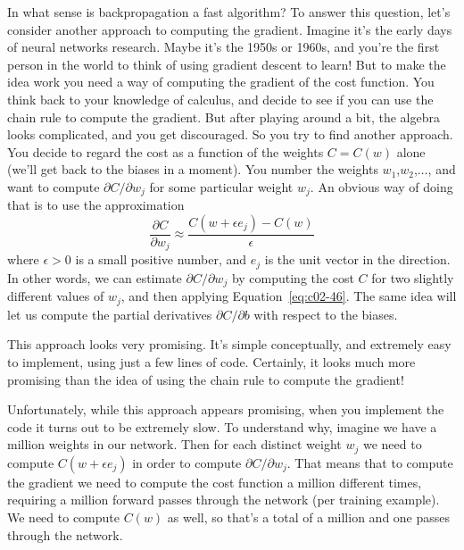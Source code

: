 In what sense is backpropagation a fast algorithm? To answer this question, let's consider another approach to computing the gradient. Imagine it's the early days of neural networks research. Maybe it's the 1950s or 1960s, and you're the first person in the world to think of using gradient descent to learn! But to make the idea work you need a way of computing the gradient of the cost function. You think back to your knowledge of calculus, and decide to see if you can use the chain rule to compute the gradient. But after playing around a bit, the algebra looks complicated, and you get discouraged. So you try to find another approach. You decide to regard the cost as a function of the weights $C=C(w)$ alone (we'll get back to the biases in a moment). You number the weights $w_1$,$w_2$,$\ldots$, and want to compute $\partial C / \partial w_{j}$ for some particular weight $w_j$. An obvious way of doing that is to use the approximation 
\begin{equation}
\frac{\partial C}{\partial w_{j}} \approx \frac{C\left(w+\epsilon e_{j}\right)-C(w)}{\epsilon}
\label{eq:c02-46}
\end{equation}
where $\epsilon>0$ is a small positive number, and $e_j$ is the unit vector in the  direction. In other words, we can estimate $\partial C / \partial w_{j}$ by computing the cost $C$ for two slightly different values of $w_j$, and then applying Equation~\ref{eq:c02-46}. The same idea will let us compute the partial derivatives $\partial C / \partial b$ with respect to the biases.

This approach looks very promising. It's simple conceptually, and extremely easy to implement, using just a few lines of code. Certainly, it looks much more promising than the idea of using the chain rule to compute the gradient!

Unfortunately, while this approach appears promising, when you implement the code it turns out to be extremely slow. To understand why, imagine we have a million weights in our network. Then for each distinct weight $w_j$ we need to compute $C\left(w+\epsilon e_{j}\right)$ in order to compute $\partial C / \partial w_{j}$. That means that to compute the gradient we need to compute the cost function a million different times, requiring a million forward passes through the network (per training example). We need to compute $C(w)$ as well, so that's a total of a million and one passes through the network.

